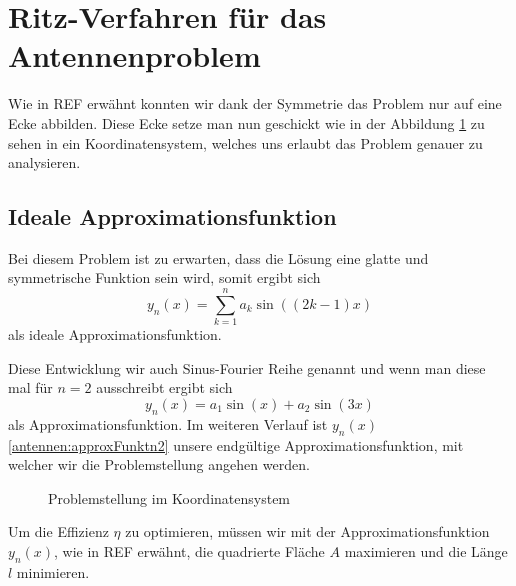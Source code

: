 %
%
% 
%
%



\section{Ritz-Verfahren für das Antennenproblem\label{antennen:ritzAnw}}

Wie in REF erwähnt konnten wir dank der Symmetrie das Problem nur auf eine Ecke abbilden. 
Diese Ecke setze man nun geschickt wie in der Abbildung \ref{antennen:koordSysBsp} zu sehen 
in ein Koordinatensystem, welches uns erlaubt das Problem genauer zu analysieren.

\subsection{Ideale Approximationsfunktion\label{antennen:unsereApproxFunkt}}

Bei diesem Problem ist zu erwarten, dass die Lösung eine glatte und symmetrische
Funktion sein wird, somit ergibt sich
\begin{equation}
	y_n(x)
	= 
	\sum_{k=1}^n a_k\sin((2k-1)x)
	\label{antennen:unserRitz}
\end{equation}
als ideale Approximationsfunktion. 

Diese Entwicklung wir auch Sinus-Fourier Reihe genannt
und wenn man diese mal für $n=2$ ausschreibt ergibt sich
\begin{equation}
	y_n(x)
	=
	a_1\sin(x)+a_2\sin(3x)
	\label{antennen:approxFunktn2}
\end{equation}
als Approximationsfunktion. Im weiteren Verlauf ist $y_n(x)$ \eqref{antennen:approxFunktn2} 
unsere endgültige Approximationsfunktion, mit welcher wir die Problemstellung angehen werden.
	

\begin{figure}[htbp]
	\centering
	\caption{Problemstellung im Koordinatensystem}
	\label{antennen:koordSysBsp}
\end{figure}
Um die Effizienz $\eta$ zu optimieren, müssen wir mit der Approximationsfunktion
$y_n(x)$, wie in REF %
erwähnt, die quadrierte Fläche $A$ maximieren und die Länge $l$ minimieren.



